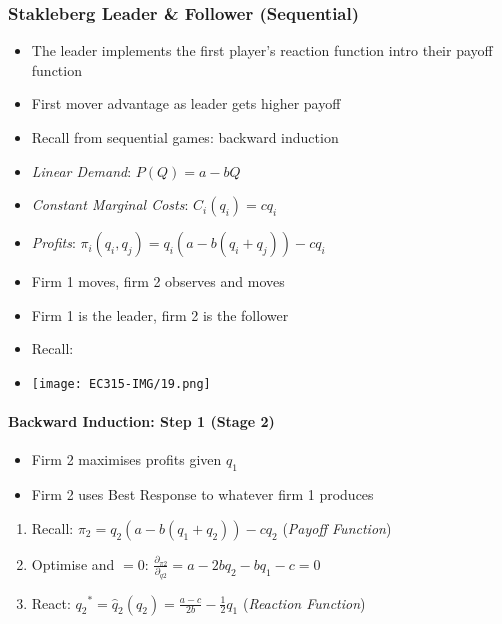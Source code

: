\documentclass[11pt, english]{article}
\begin{document}
		\subsubsection{Stakleberg Leader \& Follower (Sequential)}

	\begin{itemize}
	\setlength\itemsep{0cm}
		\item The leader implements the first player's reaction function intro their payoff function 
		\item First mover advantage as leader gets higher payoff
		\item Recall from sequential games: backward induction
		\item \textit{Linear Demand}: $P(Q)=a-bQ$
		\item \textit{Constant Marginal Costs}: $C_i(q_i)=cq_i$
		\item \textit{Profits}: $\pi_i(q_i,q_j)=q_i\left(a-b(q_i+q_j)\right)-cq_i$
		\item Firm 1 moves, firm 2 observes and moves
		\item Firm 1 is the leader, firm 2 is the follower
		\item Recall:
		\item \texttt{[image: EC315-IMG/19.png]}
	\end{itemize}

		\paragraph{Backward Induction: Step 1 (Stage 2)}

	\begin{itemize}
	\setlength\itemsep{0cm}
		\item Firm 2 maximises profits given $q_1$
		\item Firm 2 uses Best Response to whatever firm 1 produces
	\end{itemize}

	\begin{enumerate}
        \setlength\itemsep{0cm}
		\item Recall: $\pi_2=q_2(a-b(q_1+q_2))-cq_2$ (\textit{Payoff Function})
		\item Optimise and $=0$: $\frac{\partial_{\pi2}}{\partial_{q2}}=a-2{bq}_2-bq_1-c=0$
		\item React: ${q_2}^\ast={\hat{q}}_2\left(q_2\right)=\frac{a-c}{2b}-\frac{1}{2}q_1$ (\textit{Reaction Function})
	\end{enumerate}
\end{document}
